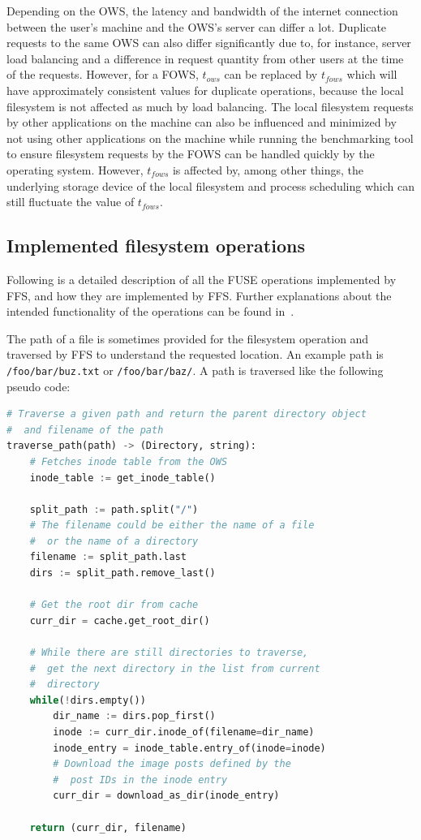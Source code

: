 Depending on the OWS, the latency and bandwidth of the internet connection between the user's machine and the OWS's server can differ a lot. Duplicate requests to the same OWS can also differ significantly due to, for instance, server load balancing and a difference in request quantity from other users at the time of the requests. However, for a FOWS, $t_{ows}$ can be replaced by $t_{fows}$ which will have approximately consistent values for duplicate operations, because the local filesystem is not affected as much by load balancing. The local filesystem requests by other applications on the machine can also be influenced and minimized by not using other applications on the machine while running the benchmarking tool to ensure filesystem requests by the FOWS can be handled quickly by the operating system. However, $t_{fows}$ is affected by, among other things, the underlying storage device of the local filesystem and process scheduling which can still fluctuate the value of $t_{fows}$.

\subsection{Implemented filesystem operations}
\label{subsec:file_op}
Following is a detailed description of all the FUSE operations implemented by FFS, and how they are implemented by FFS. Further explanations about the intended functionality of the operations can be found in \,\cite{kuenningCS135FUSEDocumentation2010}. 

The path of a file is sometimes provided for the filesystem operation and traversed by FFS to understand the requested location. An example path is \texttt{/foo/bar/buz.txt} or \texttt{/foo/bar/baz/}. A path is traversed like the following pseudo code:
\begin{lstlisting}[language=python, caption={Pseudocode of traversing a given path, returning the \texttt{Directory} and the filename}, label=lst:traverse_path,breaklines=true]
# Traverse a given path and return the parent directory object
#  and filename of the path
traverse_path(path) -> (Directory, string):
	# Fetches inode table from the OWS
	inode_table := get_inode_table()
	
	split_path := path.split("/")
	# The filename could be either the name of a file 
	#  or the name of a directory
	filename := split_path.last
	dirs := split_path.remove_last()

	# Get the root dir from cache
	curr_dir = cache.get_root_dir()

	# While there are still directories to traverse,
	#  get the next directory in the list from current
	#  directory
	while(!dirs.empty())
		dir_name := dirs.pop_first()
		inode := curr_dir.inode_of(filename=dir_name)
		inode_entry = inode_table.entry_of(inode=inode)
		# Download the image posts defined by the 
		#  post IDs in the inode entry
		curr_dir = download_as_dir(inode_entry)
	
	return (curr_dir, filename)

\end{lstlisting}

